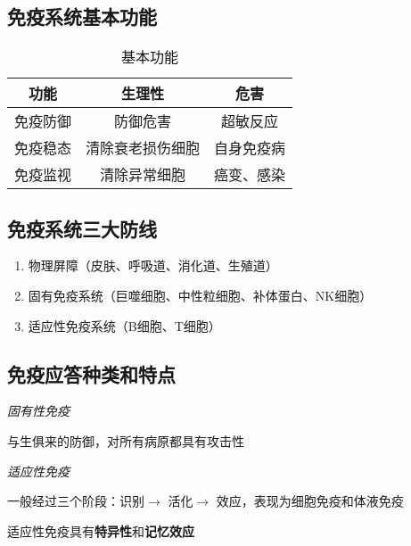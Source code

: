 \subsection{免疫系统基本功能}%
\label{sub:免疫系统基本功能}
\begin{table}[htpb]
    \centering
    \caption{基本功能}
    \label{tab:基本功能}
    \begin{tabular}{ccc}
    \toprule
    功能 & 生理性 & 危害\\
    \midrule
    免疫防御 & 防御危害 & 超敏反应\\
    免疫稳态 & 清除衰老损伤细胞 & 自身免疫病\\
    免疫监视 & 清除异常细胞 & 癌变、感染\\
    \bottomrule
    \end{tabular}
\end{table}
\subsection{免疫系统三大防线}%
\label{sub:免疫系统三大防线}
\begin{enumerate}
    \item 物理屏障（皮肤、呼吸道、消化道、生殖道）
    \item 固有免疫系统（巨噬细胞、中性粒细胞、补体蛋白、NK细胞）
    \item 适应性免疫系统（B细胞、T细胞）
\end{enumerate}
\subsection{免疫应答种类和特点}%
\label{sub:免疫应答种类和特点}
\textit{固有性免疫}

与生俱来的防御，对所有病原都具有攻击性

\textit{适应性免疫}

一般经过三个阶段：识别$\to $ 活化$\to $ 效应，表现为细胞免疫和体液免疫

\begin{notation}
    适应性免疫具有\textbf{特异性}和\textbf{记忆效应}
\end{notation}
